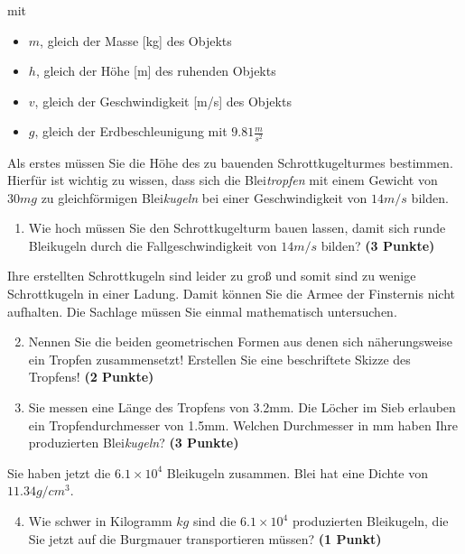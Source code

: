 \documentclass[a4paper, 9pt]{scrartcl}\usepackage[]{graphicx}\usepackage[]{xcolor}
\begin{document}
mit

\begin{itemize}[noitemsep]
\item $m$, gleich der Masse [kg] des Objekts
\item $h$, gleich der Höhe [m] des ruhenden Objekts
\item $v$, gleich der Geschwindigkeit [m/s] des Objekts
\item $g$, gleich der Erdbeschleunigung mit $9.81 \tfrac{m}{s^2}$ 
\end{itemize}

Als erstes müssen Sie die Höhe des zu bauenden Schrottkugelturmes bestimmen. Hierfür ist wichtig zu wissen, dass sich die Blei\textit{tropfen} mit einem Gewicht von $30mg$ zu gleichförmigen Blei\textit{kugeln} bei einer Geschwindigkeit von $14m/s$ bilden.

\begin{enumerate}
\item Wie hoch müssen Sie den Schrottkugelturm bauen lassen, damit sich runde Bleikugeln durch die Fallgeschwindigkeit von $14m/s$ bilden? \textbf{(3 Punkte)}
\end{enumerate}

Ihre erstellten Schrottkugeln sind leider zu gro{\ss} und somit sind zu wenige Schrottkugeln in einer Ladung. Damit können Sie die Armee der Finsternis nicht aufhalten. Die Sachlage müssen Sie einmal mathematisch untersuchen.

\begin{enumerate}
  \setcounter{enumi}{1}
\item Nennen Sie die beiden geometrischen Formen aus denen sich näherungsweise ein Tropfen zusammensetzt! Erstellen Sie eine beschriftete Skizze des Tropfens! \textbf{(2 Punkte)}
\item Sie messen eine Länge des Tropfens von 3.2mm. Die Löcher im Sieb erlauben ein Tropfendurchmesser von 1.5mm. Welchen Durchmesser in mm haben Ihre produzierten Blei\textit{kugeln}?  \textbf{(3 Punkte)}
\end{enumerate}

Sie haben jetzt die \ensuremath{6.1\times 10^{4}} Bleikugeln zusammen. Blei hat eine Dichte
von $11.34g/cm^3$.

\begin{enumerate}
  \setcounter{enumi}{3}
\item Wie schwer in Kilogramm $kg$ sind die \ensuremath{6.1\times 10^{4}} produzierten
  Bleikugeln, die Sie jetzt auf die Burgmauer transportieren müssen?
  \textbf{(1 Punkt)}
\end{enumerate}
\end{document}
